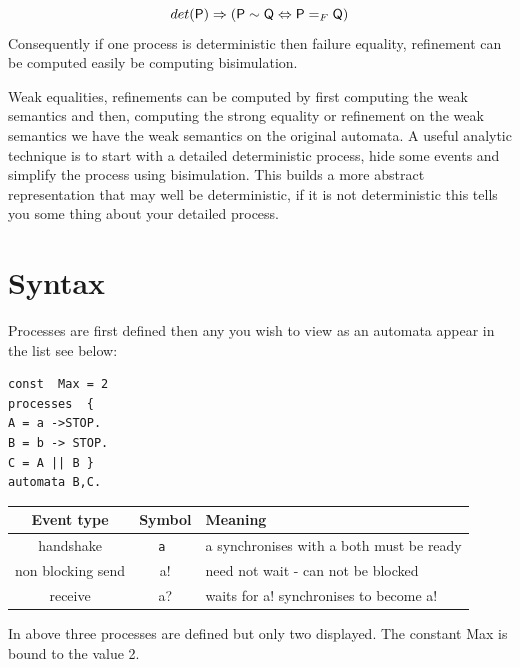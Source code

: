 \documentclass[]{article}
\begin{document}
 \[det({\sf P}) \Rightarrow ({\sf P}\sim {\sf Q} \Leftrightarrow {\sf P}=_F {\sf Q} ) \]
Consequently if one process is deterministic then failure equality, refinement can be computed easily be computing bisimulation.

Weak equalities, refinements  can be computed  by first computing the weak semantics and then, computing the strong equality or  refinement
 on the weak semantics we have the weak semantics on the original automata. A useful analytic technique is to  start with a detailed deterministic process,  hide some events and simplify the process using bisimulation.   This builds a more abstract representation that may well be deterministic, if it is not deterministic this tells you some thing about your detailed process.




\newpage
\section{Syntax}

\noindent 
 Processes are first defined then any you wish to view as an automata appear in the list  see below:
\begin{minipage}{0.2\textwidth}
\begin{verbatim}
const  Max = 2
processes  {  
A = a ->STOP.
B = b -> STOP.
C = A || B }
automata B,C.
 \end{verbatim}
 \end{minipage}
\begin{minipage}{0.65\textwidth}
\begin{tabular}{|c|c|l|} \hline Event type & Symbol & Meaning\\ \hline
handshake  & {\tt a } & {\sf a} synchronises with {\sf a}   both must be ready\\ \hline
non blocking send   & {\sf a!}  & need not wait - can not be blocked\\ \hline
receive   & {\sf a?}  & waits for {\sf a!} synchronises to become {\sf a!} \\ \hline

\end{tabular}
\end{minipage}

\noindent In above three processes are defined but only two displayed.  The constant Max is bound to the value 2.
\end{document}
